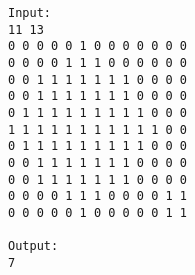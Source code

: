 \begin{verbatim}
Input:
11 13
0 0 0 0 0 1 0 0 0 0 0 0 0
0 0 0 0 1 1 1 0 0 0 0 0 0
0 0 1 1 1 1 1 1 1 0 0 0 0
0 0 1 1 1 1 1 1 1 0 0 0 0
0 1 1 1 1 1 1 1 1 1 0 0 0
1 1 1 1 1 1 1 1 1 1 1 0 0
0 1 1 1 1 1 1 1 1 1 0 0 0
0 0 1 1 1 1 1 1 1 0 0 0 0
0 0 1 1 1 1 1 1 1 0 0 0 0
0 0 0 0 1 1 1 0 0 0 0 1 1
0 0 0 0 0 1 0 0 0 0 0 1 1

Output:
7
\end{verbatim}